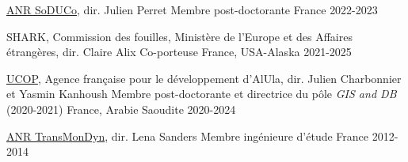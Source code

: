 

\begin{cvhonors}
  \cvhonor
    {\href{https://soduco.geohistoricaldata.org/}{ANR SoDUCo}, dir. Julien Perret} %
    {Membre post-doctorante} %
    {France} %
    {2022-2023} %
    
  \cvhonor
    {SHARK, Commission des fouilles, Ministère de l’Europe et des Affaires étrangères, dir. Claire Alix} %
    {Co-porteuse} %
    {France, USA-Alaska} %
    {2021-2025} %

  \cvhonor
    {\href{https://www.archaios.fr/ucop/}{UCOP}, Agence française pour le développement d’AlUla, dir. Julien Charbonnier et Yasmin Kanhoush} %
    {Membre post-doctorante et directrice du pôle \textit{GIS and DB} (2020-2021)} %
    {France, Arabie Saoudite} %
    {2020-2024} %

  \cvhonor
    {\href{https://transmondyn.github.io/}{ANR TransMonDyn}, dir. Lena Sanders} %
    {Membre ingénieure d'étude} %
    {France} %
    {2012-2014} %

\end{cvhonors}


